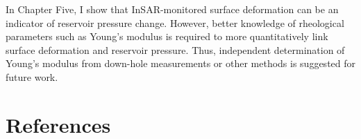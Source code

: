 In Chapter Five, I show that InSAR-monitored surface deformation can be an indicator of reservoir pressure change.  However, better knowledge of rheological parameters such as Young’s modulus is required to more quantitatively link surface deformation and reservoir pressure.  Thus, independent determination of Young’s modulus from down-hole measurements or other methods is suggested for future work.  

\section{References}
  
